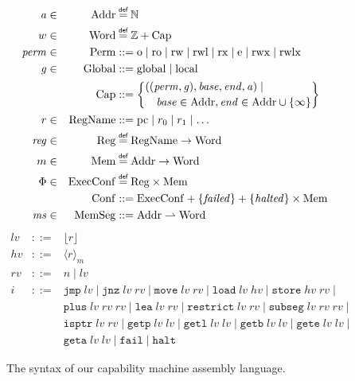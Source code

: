\documentclass[compsoc,conference,letterpaper,fleqn]{IEEEtran}
\newcommand{\parfun}{\rightharpoonup}
\newcommand{\var}[1]{\mathit{#1}}
\newcommand{\hs}{\var{ms}}
\newcommand{\ms}{\hs}
\newcommand{\hv}{\var{hv}}
\newcommand{\rv}{\var{rv}}
\newcommand{\lv}{\var{lv}}
\newcommand{\gl}{\var{g}}
\newcommand{\pcreg}{\mathrm{pc}}
\newcommand{\addr}{\var{a}}
\newcommand{\start}{\var{base}}
\newcommand{\addrend}{\var{end}}
\newcommand{\reg}{\var{reg}}
\newcommand{\perm}{\var{perm}}
\newcommand{\failed}{\mathit{failed}}
\newcommand{\halted}{\mathit{halted}}
\newcommand{\plaindom}[1]{\mathrm{#1}}
\newcommand{\Caps}{\plaindom{Cap}}
\newcommand{\Words}{\plaindom{Word}}
\newcommand{\Addrs}{\plaindom{Addr}}
\newcommand{\ExecConfs}{\plaindom{ExecConf}}
\newcommand{\RegName}{\plaindom{RegName}}
\newcommand{\Regs}{\plaindom{Reg}}
\newcommand{\Heaps}{\plaindom{Mem}}
\newcommand{\HeapSegments}{\plaindom{MemSeg}}
\newcommand{\MemSegments}{\HeapSegments}
\newcommand{\Confs}{\plaindom{Conf}}
\newcommand{\nats}{\mathbb{N}}
\newcommand{\ints}{\mathbb{Z}}
\newcommand{\Perms}{\plaindom{Perm}}
\newcommand{\Globals}{\plaindom{Global}}
\newcommand{\refreg}[1]{\lfloor #1 \rfloor}
\newcommand{\refheap}[1]{\langle #1 \rangle_m}
\newcommand{\zinstr}[1]{\mathtt{#1}}
\newcommand{\fail}{\zinstr{fail}}
\newcommand{\halt}{\zinstr{halt}}
\newcommand{\oneinstr}[2]{\zinstr{#1} \; #2}
\newcommand{\jmp}[1]{\oneinstr{jmp}{#1}}
\newcommand{\twoinstr}[3]{\zinstr{#1} \; #2 \; #3}
\newcommand{\restricttwo}[2]{\twoinstr{restrict}{#1}{#2}}
\newcommand{\jnz}[2]{\twoinstr{jnz}{#1}{#2}}
\newcommand{\isptr}[2]{\twoinstr{isptr}{#1}{#2}}
\newcommand{\geta}[2]{\twoinstr{geta}{#1}{#2}}
\newcommand{\getb}[2]{\twoinstr{getb}{#1}{#2}}
\newcommand{\gete}[2]{\twoinstr{gete}{#1}{#2}}
\newcommand{\getp}[2]{\twoinstr{getp}{#1}{#2}}
\newcommand{\getl}[2]{\twoinstr{getl}{#1}{#2}}
\newcommand{\move}[2]{\twoinstr{move}{#1}{#2}}
\newcommand{\store}[2]{\twoinstr{store}{#1}{#2}}
\newcommand{\load}[2]{\twoinstr{load}{#1}{#2}}
\newcommand{\lea}[2]{\twoinstr{lea}{#1}{#2}}
\newcommand{\threeinstr}[4]{\zinstr{#1} \; #2 \; #3 \; #4}
\newcommand{\subseg}[3]{\threeinstr{subseg}{#1}{#2}{#3}}
\newcommand{\plus}[3]{\threeinstr{plus}{#1}{#2}{#3}}
\newcommand{\plainperm}[1]{\mathrm{#1}}
\newcommand{\noperm}{\plainperm{o}}
\newcommand{\readonly}{\plainperm{ro}}
\newcommand{\readwrite}{\plainperm{rw}}
\newcommand{\exec}{\plainperm{rx}}
\newcommand{\entry}{\plainperm{e}}
\newcommand{\rwx}{\plainperm{rwx}}
\newcommand{\readwritel}{\plainperm{rwl}}
\newcommand{\rwlx}{\plainperm{rwlx}}
\newcommand{\local}{\plainperm{local}}
\newcommand{\glob}{\plainperm{global}}
\newcommand{\isdef}{\mathrel{\overset{\makebox[0pt]{\mbox{\normalfont\tiny\sffamily def}}}{=}}}
\newcommand\bnfdef{\mathrel{::=}}
\begin{document}
\begin{figure}
  \begin{align*}
    \addr   &\in& \Addrs &\isdef \nats\\
    w &\in&\Words &\isdef \ints + \Caps \\
    \perm   &\in& \Perms &::= \noperm \mid \readonly\mid \readwrite\mid \readwritel\mid \exec\mid \entry\mid \rwx\mid \rwlx\\
    \gl&\in&\Globals & ::= \glob \mid \local \\
     && \Caps  &::= \left\{
                       \begin{multlined}
                         ((\perm,\gl),\start,\addrend,\addr)\mid\\
                         \start\in\Addrs,\addrend \in
                         \Addrs\cup \{\infty\}
                       \end{multlined} \right\}\\
    r       &\in& \RegName&\bnfdef \pcreg\mid r_0\mid r_1\mid\ldots\\
    \reg &\in& \Regs  &\isdef \RegName \rightarrow \Words\\
    m&\in& \Heaps &\isdef \Addrs \rightarrow \Words \\
    \Phi    &\in& \ExecConfs  &\isdef \Regs \times \Heaps \\
    &&\Confs &::= \ExecConfs + \{\failed \} + \{\halted\} \times \Heaps \\
    \ms     &\in& \MemSegments &::= \Addrs \parfun \Words
  \end{align*}
  \begin{equation*}
  \begin{array}{rcl}
    \lv    &::=& \refreg{r} \\
    \hv    &::=& \refheap{r}\\
    \rv    &::=& n \mid \lv \\
    i      &::=& 
                 \jmp{\lv} \mid 
                 \jnz{\lv}{\rv} \mid
                 \move{\lv}{\rv} \mid 
                 \load{\lv}{\hv} \mid 
                 \store{\hv}{\rv} \mid  \\
           &   & \plus{\lv}{\rv}{\rv} \mid 
                 \lea{\lv}{\rv} \mid 
                 \restricttwo{\lv}{\rv} \mid 
                 \subseg{\lv}{\rv}{\rv} \mid  \\
           &   & \isptr{\lv}{\rv} \mid 
                 \getp{\lv}{\lv} \mid 
                 \getl{\lv}{\lv} \mid 
                 \getb{\lv}{\lv} \mid
                 \gete{\lv}{\lv} \mid\\
           &   & \geta{\lv}{\lv} \mid 
                 \fail \mid
                 \halt 
  \end{array}
\end{equation*}
  \caption{The syntax of our capability machine assembly language.}
  \label{fig:syntax}
\end{figure}
\end{document}
